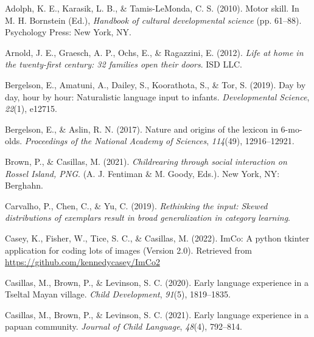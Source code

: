 \documentclass[10pt, letterpaper]{article}
\newenvironment{CSLReferences}%
  {}%
  {\par}
\begin{document}
\setlength{\parindent}{-0.1in} 
\setlength{\leftskip}{0.125in}

\noindent

\hypertarget{refs}{}
\begin{CSLReferences}{1}{0}
\leavevmode\hypertarget{ref-adolph2010motor}{}%
Adolph, K. E., Karasik, L. B., \& Tamis-LeMonda, C. S. (2010). Motor
skill. In M. H. Bornstein (Ed.), \emph{Handbook of cultural
developmental science} (pp. 61--88). Psychology Press: New York, NY.

\leavevmode\hypertarget{ref-arnold2012life}{}%
Arnold, J. E., Graesch, A. P., Ochs, E., \& Ragazzini, E. (2012).
\emph{Life at home in the twenty-first century: 32 families open their
doors}. ISD LLC.

\leavevmode\hypertarget{ref-bergelson2019day}{}%
Bergelson, E., Amatuni, A., Dailey, S., Koorathota, S., \& Tor, S.
(2019). Day by day, hour by hour: Naturalistic language input to
infants. \emph{Developmental Science}, \emph{22}(1), e12715.

\leavevmode\hypertarget{ref-bergelson2017nature}{}%
Bergelson, E., \& Aslin, R. N. (2017). Nature and origins of the lexicon
in 6-mo-olds. \emph{Proceedings of the National Academy of Sciences},
\emph{114}(49), 12916--12921.

\leavevmode\hypertarget{ref-brownIPchildrearing}{}%
Brown, P., \& Casillas, M. (2021). \emph{Childrearing through social
interaction on {Rossel Island, PNG}}. (A. J. Fentiman \& M. Goody,
Eds.). New York, NY: Berghahn.

\leavevmode\hypertarget{ref-carvalho2019rethinking}{}%
Carvalho, P., Chen, C., \& Yu, C. (2019). \emph{Rethinking the input:
Skewed distributions of exemplars result in broad generalization in
category learning}.

\leavevmode\hypertarget{ref-casey2022imco}{}%
Casey, K., Fisher, W., Tice, S. C., \& Casillas, M. (2022). ImCo: A
python tkinter application for coding lots of images (Version 2.0).
Retrieved from \url{https://github.com/kennedycasey/ImCo2}

\leavevmode\hypertarget{ref-casillas2020early}{}%
Casillas, M., Brown, P., \& Levinson, S. C. (2020). Early language
experience in a {Tseltal Mayan} village. \emph{Child Development},
\emph{91}(5), 1819--1835.

\leavevmode\hypertarget{ref-casillas2021early}{}%
Casillas, M., Brown, P., \& Levinson, S. C. (2021). Early language
experience in a papuan community. \emph{Journal of Child Language},
\emph{48}(4), 792--814.


\end{CSLReferences}
\end{document}
